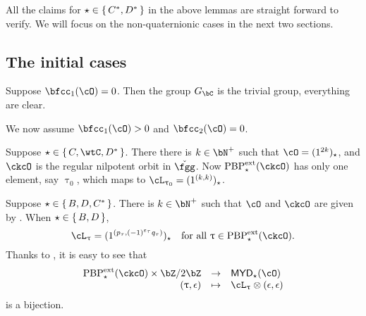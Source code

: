 \documentclass[12pt,a4paper]{amsart}
\def\MYD{{\mathsf{MYD}}}
\numberwithin{equation}{section}
\newtheorem{lem}[thm]{Lemma}
\theoremstyle{remark}
\def\PBPes{\mathrm{PBP}^{\mathrm{ext}}_{\star}}
\begin{document}






All the claims for $\star\in \set{C^{*},D^{*}}$ in the above lemmas are straight forward to verify.
We will focus on the non-quaternionic cases in the next two sections.

\subsection{The initial cases}\label{sec:pfDC.init}
Suppose $\bfcc_{1}(\cO)=0$. Then the group $G_{\bC}$ is the trivial group,
everything are clear.

We now assume $\bfcc_{1}(\cO)>0$ and $\bfcc_{2}(\cO)=0$.

Suppose $\star \in \set{C,\wtC,D^*}$. There there is $k\in\bN^{+}$ such that
$\cO = (1^{2k})_{\star}$, and $\ckcO$ is the regular nilpotent orbit in $\ckfgg$.
Now $\PBPes(\ckcO)$ has only one element, say $\uptau_{0}$, which
maps to $\ac_{\uptau_{0}} = (1^{(k,k)})_{\star}$.

Suppose $\star \in \set{B,D,C^{*}}$. There is $k\in \bN^{+}$ such that
$\cO$ and $\ckcO$ are given by .
When $\star \in \set{B,D}$,
\[
  \ac_{\uptau} = (1^{(p_{\tau},(-1)^{\varepsilon_{\tau}}q_{\tau})})_{\star}
  \quad  \Forall \uptau\in \PBPes(\ckcO).
\]
Thanks to , it is easy to see that
\[
  \begin{array}{rcl}
    \PBPes(\ckcO)\times \bZ/2\bZ & \rightarrow & \MYD_{\star}(\cO)\\
    (\uptau,\epsilon) & \mapsto & \ac_{\uptau}\otimes (\epsilon,\epsilon)
  \end{array}
\]
is a bijection.
\end{document}
